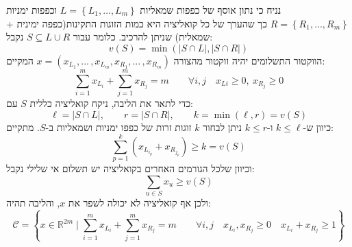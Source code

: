 \documentclass{tstextbook}
\begin{document}
\begin{example}
נניח כי נתון אוסף של כפפות שמאליות \(L=\left\{  L_{1},\dots,L_{m}  \right\}\) וכפפות ימניות \(R=\left\{  R_{1},\dots,R_{m}  \right\}\) כך שהערך של כל קואליציה היא כמות הזוגות התקינות(כפפה ימינית + שמאלית) שניתן להרכיב. כלומר עבור \(S\subseteq L\cup R\) נקבל:
$$v(S)=\min \left( \left\lvert  S\cap L  \right\rvert ,\left\lvert  S\cap R  \right\rvert  
\right)$$
הווקטור התשלומים יהיה ווקטור מהצורה \(x=\left(x_{L_{1}},...\,,x_{L_{m}},x_{R_{1}},...\,,x_{R_{m}}\right)\) המקיים:
$$\sum_{i=1}^{m}x_{L_{i}}+\sum_{j=1}^{m}x_{R_{j}}=m\qquad \forall i,j\quad x_{L i}\geq0,\ x_{R_{j}}\geq0$$
כדי לתאר את הליבה, ניקח קואליציה כללית \(S\) עם:
$$\ell=|S\cap L|,\qquad r=|S\cap R|,\qquad k=\operatorname*{min}(\ell,r)=v(S)$$
כיוון ש-\(k\leq \ell\) ו-\(k\leq r\) ניתן לבחור \(k\) זוגות זרות של כפפו ימניות ושמאליות ב-\(S\). מתקיים:
$$\sum_{p=1}^{k}\left(x_{L_{i_{p}}}+x_{R_{j_{p}}}\right)\geq k=v(S)$$
וכיוון שלכל הגורמים האחרים בקואליציה יש תשלום אי שלילי נקבל:
$$\sum_{u\in S}x_{u}\geq v(S)$$
ולכן אף קואליציה לא יכולה לשפר את \(x\), והליבה תהיה:
$$\mathcal{C} =\left\{  x \in \mathbb{R}^{2m}\mid \sum_{i=1}^{m}x_{L_{i}}+\sum_{j=1}^{m} x_{R_{j}}=m\qquad \forall i,j\quad x_{L_{i}},x_{R_{j}}\geq 0\quad  x_{L_{i}}+x_{R_{j}}\geq 1 \right\}$$

\end{example}
\end{document}
